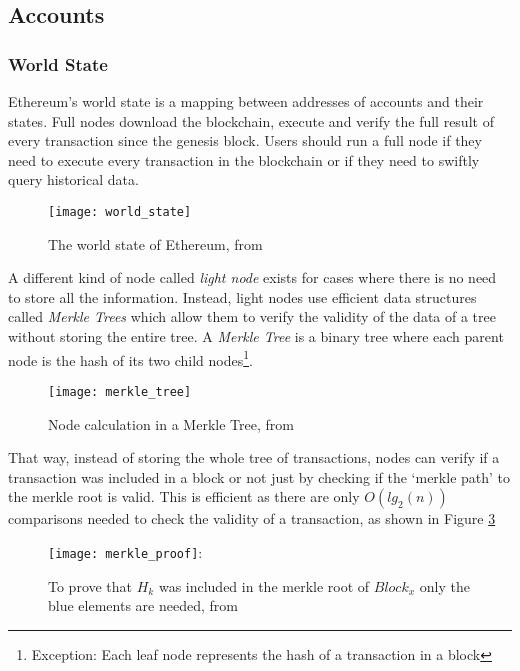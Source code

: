 \subsection{Accounts}

\subsubsection{World State}
Ethereum's world state is a mapping between addresses of accounts and their states. Full nodes download the blockchain, execute and verify the full result of every transaction since the genesis block. Users should run a full node if they need to execute every transaction in the blockchain or if they need to swiftly query historical data. 

\begin{figure}[H]
    \centering
    \texttt{[image: world\_state]}
    \caption{The world state of Ethereum, from~\cite{vitalik}}
    \label{fig:worldstate}
\end{figure}

A different kind of node called \textit{light node} exists for cases where there is no need to store all the information. Instead, light nodes use efficient data structures called \textit{Merkle Trees} which allow them to verify the validity of the data of a tree without storing the entire tree. A \textit{Merkle Tree} is a binary tree where each parent node is the hash of its two child nodes\footnote{Exception: Each leaf node represents the hash of a transaction in a block}. 

\begin{figure}[H]
    \centering
    \texttt{[image: merkle\_tree]}
    \caption{Node calculation in a Merkle Tree, from~\cite{smartproperty}}
    \label{fig:merkletree}
\end{figure}

That way, instead of storing the whole tree of transactions, nodes can verify if a transaction was included in a block or not just by checking if the `merkle path' to the merkle root is valid. This is efficient as there are only $O(lg_{2}(n))$ comparisons needed to check the validity of a transaction, as shown in Figure \ref{fig:merkleproof}

\begin{figure}[H]
    \centering
    \texttt{[image: merkle\_proof]}:
    \caption{To prove that $H_{k}$ was included in the merkle root of $Block_{x}$ only the blue elements are needed, from \cite{smartproperty}}
    \label{fig:merkleproof}
\end{figure}

